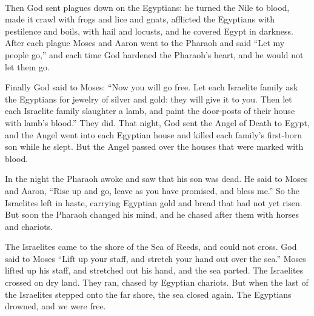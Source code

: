\documentclass[a4paper,10pt,openany]{memoir}
\newcommand{\HgFill}{\vfill \hrule \vfill}
\newenvironment{HgEnglish}{\strut\\\noindent}{\vspace{1em}}
\begin{document}
\begin{HgEnglish}
  Then God sent plagues down on the Egyptians: 
  he turned the Nile to blood, 
  made it crawl with frogs and lice and gnats, 
  afflicted the Egyptians with pestilence and boils, 
  with hail and locusts, 
  and he covered Egypt in darkness.
  After each plague Moses and Aaron went to the Pharaoh 
  and said ``Let my people go,'' 
  and each time God hardened the Pharaoh's heart, 
  and he would not let them go.

  Finally God said to Moses: 
  ``Now you will go free.
  Let each Israelite family ask the Egyptians
  for jewelry of silver and gold: 
  they will give it to you.
  Then let each Israelite family slaughter a lamb, 
  and paint the door-posts of their house with lamb's blood.'' 
  They did. 
  That night, God sent the Angel of Death to Egypt, 
  and the Angel went into each Egyptian house 
  and killed each family's first-born son while he slept. 
  But the Angel passed over the houses that were marked with blood.

  In the night the Pharaoh awoke
  and saw that his son was dead. 
  He said to Moses and Aaron,
  ``Rise up and go, leave as you have promised,
  and bless me.''
  So the Israelites left in haste,
  carrying Egyptian gold
  and bread that had not yet risen.
  But soon the Pharaoh changed his mind, 
  and he chased after them with horses and chariots.

  The Israelites came to the shore of the Sea of Reeds, 
  and could not cross. 
  God said to Moses ``Lift up your staff,
  and stretch your hand out over the sea.'' 
  Moses lifted up his staff, 
  and stretched out his hand,
  and the sea parted. 
  The Israelites crossed on dry land. 
  They ran, chased by Egyptian chariots.
  But when the last of the Israelites stepped onto the far shore, 
  the sea closed again.
  The Egyptians drowned, 
  and we were free.

\end{HgEnglish}

%
\end{document}
